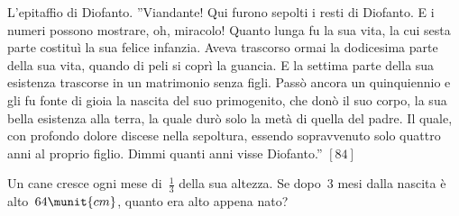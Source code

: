 \begin{htmulticols}{2}
% 

\begin{esercizio}[*]
\label{ese:14.71}
L'epitaffio di Diofanto. ''Viandante! Qui furono sepolti i resti di Diofanto. E 
i numeri possono mostrare, oh, miracolo! Quanto lunga fu la sua vita, la cui 
sesta parte costituì la sua felice infanzia. Aveva trascorso ormai la 
dodicesima 
parte della sua vita, quando di peli si coprì la guancia. E la settima parte 
della sua esistenza trascorse in un matrimonio senza figli. Passò ancora un 
quinquiennio e gli fu fonte di gioia la nascita del suo primogenito, che donò 
il 
suo corpo, la sua bella esistenza alla terra, la quale durò solo la metà di 
quella del padre. Il quale, con profondo dolore discese nella sepoltura, 
essendo 
sopravvenuto solo quattro anni al proprio figlio. Dimmi quanti anni visse 
Diofanto.'' \hfill \(\left[84\right]\)
\end{esercizio}

\begin{esercizio}[*]
\label{ese:14.72}
Un cane cresce ogni mese di~\(\frac{1}{3}\) della sua altezza. Se dopo~\(3\) 
mesi 
dalla nascita è alto~\(64\munit{cm}\), quanto era alto appena nato?
\end{esercizio}


\end{htmulticols}
